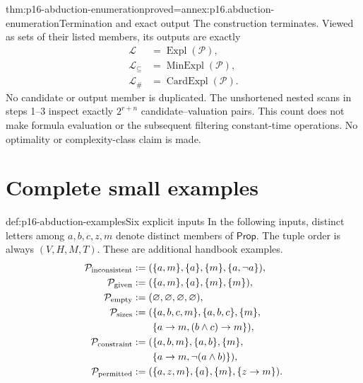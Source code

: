 \begin{hbtheorem}{thm:p16-abduction-enumeration}{proved=annex:p16.abduction-enumeration}{Termination and exact output}
The construction terminates. Viewed as sets of their listed members, its
outputs are exactly
\[
\begin{aligned}
 \mathcal L&=\operatorname{Expl}(\mathcal P),\\
 \mathcal L_{\subseteq}&=\operatorname{MinExpl}(\mathcal P),\\
 \mathcal L_{\#}&=\operatorname{CardExpl}(\mathcal P).
\end{aligned}
\]
No candidate or output member is duplicated. The unshortened nested scans
in steps 1--3 inspect exactly \(2^{r+n}\) candidate--valuation pairs.
This count does not make formula evaluation or the subsequent filtering
constant-time operations. No optimality or complexity-class claim is made.
\end{hbtheorem}

\section{Complete small examples}
\label{sec:p16-abduction-examples}

\begin{hbdefinition}{def:p16-abduction-examples}{Six explicit inputs}
In the following inputs, distinct letters among \(a,b,c,z,m\) denote
distinct members of \(\mathsf{Prop}\). The tuple order is always \((V,H,M,T)\).
These are additional handbook examples.
\[
\begin{aligned}
 \mathcal P_{\rm inconsistent}
   &\mathrel{:=}(\{a,m\},\{a\},\{m\},\{a,\neg a\}),\\
 \mathcal P_{\rm given}
   &\mathrel{:=}(\{a,m\},\{a\},\{m\},\{m\}),\\
 \mathcal P_{\rm empty}
   &\mathrel{:=}(\varnothing,\varnothing,\varnothing,\varnothing),\\
 \mathcal P_{\rm sizes}
   &\mathrel{:=}(\{a,b,c,m\},\{a,b,c\},\{m\},\\
   &\hspace{2em}\{a\to m,(b\land c)\to m\}),\\
 \mathcal P_{\rm constraint}
   &\mathrel{:=}(\{a,b,m\},\{a,b\},\{m\},\\
   &\hspace{2em}\{a\to m,\neg(a\land b)\}),\\
 \mathcal P_{\rm permitted}
   &\mathrel{:=}(\{a,z,m\},\{a\},\{m\},\{z\to m\}).
\end{aligned}
\]
\end{hbdefinition}


